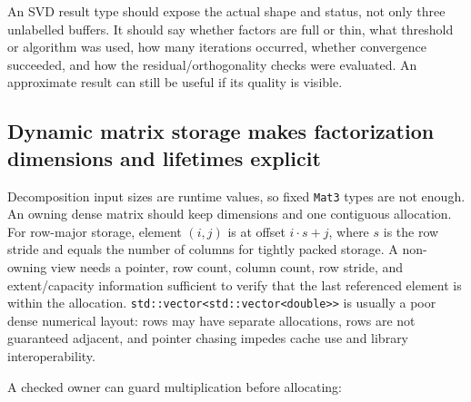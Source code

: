 An SVD result type should expose the actual shape and status, not only three unlabelled buffers. It should say whether factors are full or thin, what threshold or algorithm was used, how many iterations occurred, whether convergence succeeded, and how the residual/orthogonality checks were evaluated. An approximate result can still be useful if its quality is visible.

\subsection{Dynamic matrix storage makes factorization dimensions and lifetimes explicit}\label{dynamic-matrix-storage-makes-factorization-dimensions-and-lifetimes-explicit}

Decomposition input sizes are runtime values, so fixed \texttt{Mat3} types are not enough. An owning dense matrix should keep dimensions and one contiguous allocation. For row-major storage, element \((i,j)\) is at offset \(i\cdot s+j\), where \(s\) is the row stride and equals the number of columns for tightly packed storage. A non-owning view needs a pointer, row count, column count, row stride, and extent/capacity information sufficient to verify that the last referenced element is within the allocation. \texttt{std::vector\textless{}std::vector\textless{}double\textgreater{}\textgreater{}} is usually a poor dense numerical layout: rows may have separate allocations, rows are not guaranteed adjacent, and pointer chasing impedes cache use and library interoperability.

A checked owner can guard multiplication before allocating:

